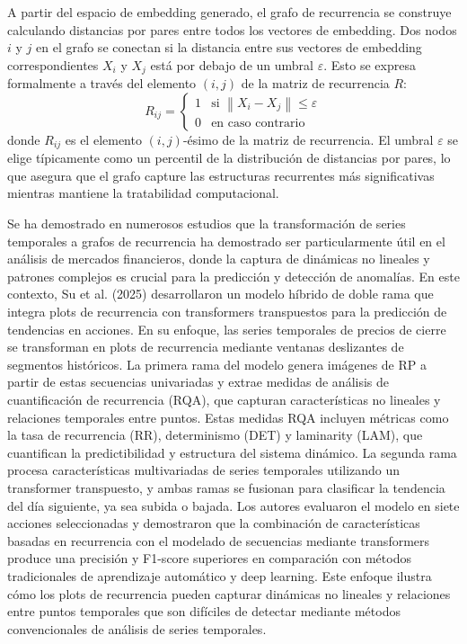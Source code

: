 \documentclass[11pt,a4paper]{article}
\begin{document}
A partir del espacio de embedding generado, el grafo de recurrencia se construye calculando distancias por pares entre todos los vectores de embedding. Dos nodos $i$ y $j$ en el grafo se conectan si la distancia entre sus vectores de embedding correspondientes $X_i$ y $X_j$ está por debajo de un umbral $\varepsilon$. Esto se expresa formalmente a través del elemento $(i, j)$ de la matriz de recurrencia $R$:
\begin{equation}
R_{ij} = \begin{cases}
1 & \text{si } \left\|X_i - X_j\right\| \le \varepsilon \\
0 & \text{en caso contrario}
\end{cases}
\end{equation}
donde $R_{ij}$ es el elemento $(i, j)$-ésimo de la matriz de recurrencia. El umbral $\varepsilon$ se elige típicamente como un percentil de la distribución de distancias por pares, lo que asegura que el grafo capture las estructuras recurrentes más significativas mientras mantiene la tratabilidad computacional.

Se ha demostrado en numerosos estudios que la transformación de series temporales a grafos de recurrencia ha demostrado ser particularmente útil en el análisis de mercados financieros, donde la captura de dinámicas no lineales y patrones complejos es crucial para la predicción y detección de anomalías. En este contexto, Su et al. (2025) \cite{su2025hybrid} desarrollaron un modelo híbrido de doble rama que integra plots de recurrencia con transformers transpuestos para la predicción de tendencias en acciones. En su enfoque, las series temporales de precios de cierre se transforman en plots de recurrencia mediante ventanas deslizantes de segmentos históricos. La primera rama del modelo genera imágenes de RP a partir de estas secuencias univariadas y extrae medidas de análisis de cuantificación de recurrencia (RQA), que capturan características no lineales y relaciones temporales entre puntos. Estas medidas RQA incluyen métricas como la tasa de recurrencia (RR), determinismo (DET) y laminarity (LAM), que cuantifican la predictibilidad y estructura del sistema dinámico. La segunda rama procesa características multivariadas de series temporales utilizando un transformer transpuesto, y ambas ramas se fusionan para clasificar la tendencia del día siguiente, ya sea subida o bajada. Los autores evaluaron el modelo en siete acciones seleccionadas y demostraron que la combinación de características basadas en recurrencia con el modelado de secuencias mediante transformers produce una precisión y F1-score superiores en comparación con métodos tradicionales de aprendizaje automático y deep learning. Este enfoque ilustra cómo los plots de recurrencia pueden capturar dinámicas no lineales y relaciones entre puntos temporales que son difíciles de detectar mediante métodos convencionales de análisis de series temporales.
\end{document}
